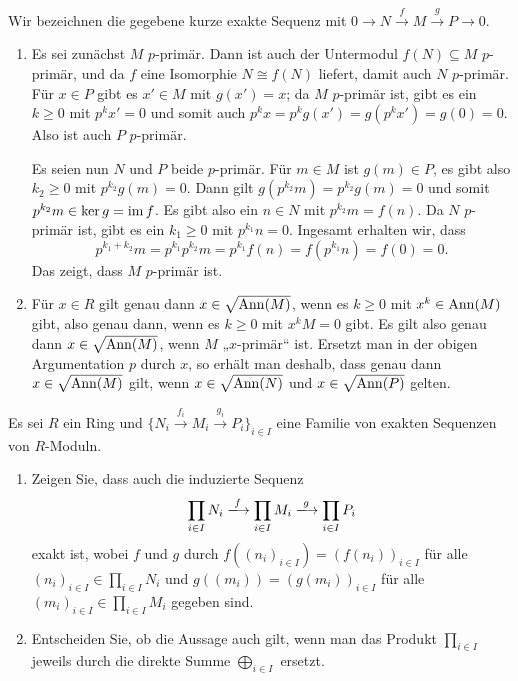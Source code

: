 \begin{solution}
  Wir bezeichnen die gegebene kurze exakte Sequenz mit $0 \to N \xrightarrow{f} M \xrightarrow{g} P \to 0$.
  \begin{enumerate}
    \item
      Es sei zunächst $M$ $p$-primär.
      Dann ist auch der Untermodul $f(N) \subseteq M$ $p$-primär, und da $f$ eine Isomorphie $N \cong f(N)$ liefert, damit auch $N$ $p$-primär.
      Für $x \in P$ gibt es $x' \in M$ mit $g(x') = x$; da $M$ $p$-primär ist, gibt es ein $k \geq 0$ mit $p^k x' = 0$ und somit auch $p^k x = p^k g(x') = g(p^k x') = g(0) = 0$.
      Also ist auch $P$ $p$-primär.
      
      Es seien nun $N$ und $P$ beide $p$-primär.
      Für $m \in M$ ist $g(m) \in P$, es gibt also $k_2 \geq 0$ mit $p^{k_2} g(m) = 0$.
      Dann gilt $g(p^{k_2} m) = p^{k_2} g(m) = 0$ und somit $p^{k_2} m \in \ker g = \operatorname{im} f$.
      Es gibt also ein $n \in N$ mit $p^{k_2} m = f(n)$.
      Da $N$ $p$-primär ist, gibt es ein $k_1 \geq 0$ mit $p^{k_1} n = 0$.
      Ingesamt erhalten wir, dass
      \[
          p^{k_1 + k_2} m
        = p^{k_1} p^{k_2} m
        = p^{k_1} f(n)
        = f(p^{k_1} n)
        = f(0)
        = 0.
      \]
      Das zeigt, dass $M$ $p$-primär ist.
    \item
      Für $x \in R$ gilt genau dann $x \in \sqrt{\operatorname{Ann}(M)}$, wenn es $k \geq 0$ mit $x^k \in \operatorname{Ann}(M)$ gibt, also genau dann, wenn es $k \geq 0$ mit $x^k M = 0$ gibt.
      Es gilt also genau dann $x \in \sqrt{\operatorname{Ann}(M)}$, wenn $M$ „$x$-primär“ ist.
      Ersetzt man in der obigen Argumentation $p$ durch $x$, so erhält man deshalb, dass genau dann $x \in \sqrt{\operatorname{Ann}(M)}$ gilt, wenn $x \in \sqrt{\operatorname{Ann}(N)}$ und $x \in \sqrt{\operatorname{Ann}(P)}$ gelten.
  \end{enumerate}
\end{solution}


\begin{question}[subtitle = Produkte und Summen kurzer exakter Sequenzen]
  Es sei $R$ ein Ring und $\{ N_i \xrightarrow{f_i} M_i \xrightarrow{g_i} P_i \}_{i \in I}$ eine Familie von exakten Sequenzen von $R$-Moduln.
  \begin{enumerate}
    \item
      Zeigen Sie, dass auch die induzierte Sequenz
      \[
                            \prod_{i \in I} N_i
        \xlongrightarrow{f} \prod_{i \in I} M_i
        \xlongrightarrow{g} \prod_{i \in I} P_i
      \]
      exakt ist, wobei $f$ und $g$ durch $f((n_i)_{i \in I}) = (f(n_i))_{i \in I}$ für alle $(n_i)_{i \in I} \in \prod_{i \in I} N_i$ und $g((m_i)) = (g(m_i))_{i \in I}$ für alle $(m_i)_{i \in I} \in \prod_{i \in I} M_i$ gegeben sind.
    \item
      Entscheiden Sie, ob die Aussage auch gilt, wenn man das Produkt $\prod_{i \in I}$ jeweils durch die direkte Summe $\bigoplus_{i \in I}$ ersetzt.
  \end{enumerate}
\end{question}


